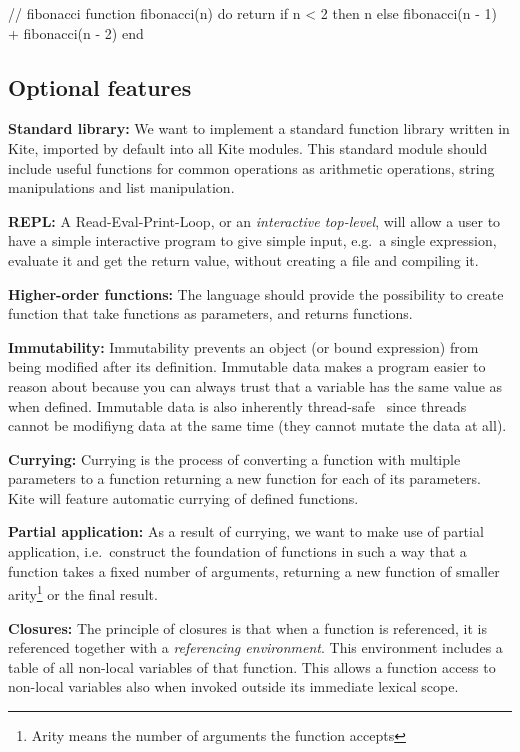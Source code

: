 \begin{pseudo}
// fibonacci
function fibonacci(n) do
  return if n < 2
    then n
    else fibonacci(n - 1) + fibonacci(n - 2)
end
\end{pseudo}


\subsection{Optional features}

\textbf{Standard library:}
We want to implement a standard function library written in Kite, imported by default into all Kite modules. This standard module should include useful functions for common operations as arithmetic operations, string manipulations and list manipulation.

\textbf{REPL:}
A Read-Eval-Print-Loop, or an \emph{interactive top-level}, will allow a user to have a simple interactive program to give simple input, e.g.\ a single expression, evaluate it and get the return value, without creating a file and compiling it.

\textbf{Higher-order functions:}
The language should provide the possibility to create function that take functions as parameters, and returns functions.

\textbf{Immutability:}
Immutability prevents an object (or bound expression) from being modified after its definition. Immutable data makes a program easier to reason about because you can always trust that a variable has the same value as when defined. Immutable data is also inherently thread-safe~\cite[sec. 3.4]{goetz06} since threads cannot be modifiyng data at the same time (they cannot mutate the data at all).

\textbf{Currying:}
Currying is the process of converting a function with multiple parameters to a function returning a new function for each of its parameters. Kite will feature automatic currying of defined functions.

\textbf{Partial application:}
As a result of currying, we want to make use of partial application, i.e.\ construct the foundation of functions in such a way that a function takes a fixed number of arguments, returning a new function of smaller arity\footnote{Arity means the number of arguments the function accepts} or the final result.

\textbf{Closures:}
The principle of closures is that when a function is referenced, it is referenced together with a \emph{referencing environment}. This environment includes a table of all non-local variables of that function. This allows a function access to non-local  variables also when invoked outside its immediate lexical scope.

